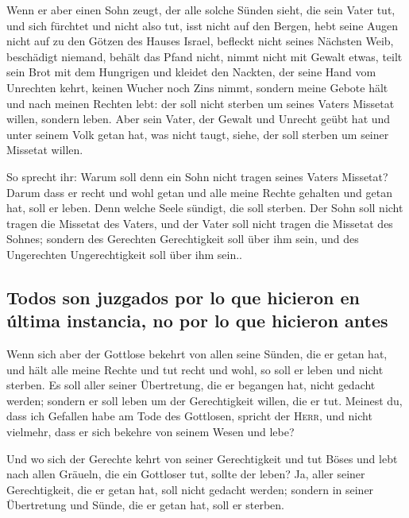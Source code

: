  Wenn er aber einen Sohn zeugt, der alle solche Sünden
sieht, die sein Vater tut, und sich fürchtet und nicht also tut,
 isst nicht auf den Bergen, hebt seine Augen nicht auf zu
den Götzen des Hauses Israel, befleckt nicht seines Nächsten Weib,
 beschädigt niemand, behält das Pfand nicht, nimmt nicht
mit Gewalt etwas, teilt sein Brot mit dem Hungrigen und kleidet den
Nackten,  der seine Hand vom Unrechten kehrt, keinen
Wucher noch Zins nimmt, sondern meine Gebote hält und nach meinen
Rechten lebt: der soll nicht sterben um seines Vaters Missetat willen,
sondern leben.  Aber sein Vater, der Gewalt und Unrecht
geübt hat und unter seinem Volk getan hat, was nicht taugt, siehe, der
soll sterben um seiner Missetat willen.

 So sprecht ihr: Warum soll denn ein Sohn nicht tragen
seines Vaters Missetat? Darum dass er recht und wohl getan und alle
meine Rechte gehalten und getan hat, soll er leben.  Denn
welche Seele sündigt, die soll sterben. Der Sohn soll nicht tragen die
Missetat des Vaters, und der Vater soll nicht tragen die Missetat des
Sohnes; sondern des Gerechten Gerechtigkeit soll über ihm sein, und des
Ungerechten Ungerechtigkeit soll über ihm sein..

\hypertarget{todos-son-juzgados-por-lo-que-hicieron-en-uxfaltima-instancia-no-por-lo-que-hicieron-antes}{%
\subsection{Todos son juzgados por lo que hicieron en última instancia,
no por lo que hicieron
antes}\label{todos-son-juzgados-por-lo-que-hicieron-en-uxfaltima-instancia-no-por-lo-que-hicieron-antes}}

 Wenn sich aber der Gottlose bekehrt von allen seine
Sünden, die er getan hat, und hält alle meine Rechte und tut recht und
wohl, so soll er leben und nicht sterben.  Es soll aller
seiner Übertretung, die er begangen hat, nicht gedacht werden; sondern
er soll leben um der Gerechtigkeit willen, die er tut. 
Meinest du, dass ich Gefallen habe am Tode des Gottlosen, spricht der
\textsc{Herr}, und nicht vielmehr, dass er sich bekehre von seinem Wesen
und lebe?

 Und wo sich der Gerechte kehrt von seiner Gerechtigkeit
und tut Böses und lebt nach allen Gräueln, die ein Gottloser tut, sollte
der leben? Ja, aller seiner Gerechtigkeit, die er getan hat, soll nicht
gedacht werden; sondern in seiner Übertretung und Sünde, die er getan
hat, soll er sterben.

